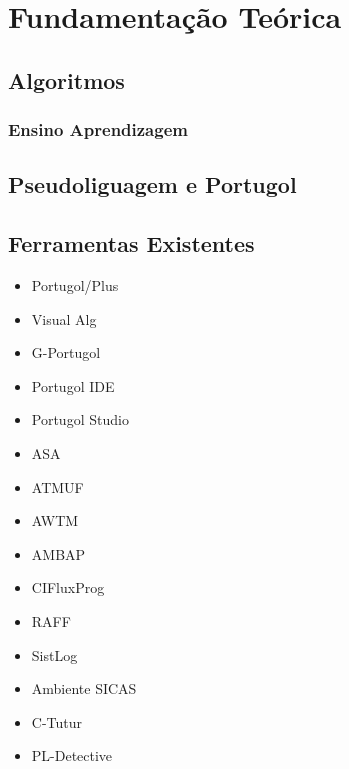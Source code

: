 
\chapter{Fundamentação Teórica}

\section{Algoritmos}

\subsection{Ensino Aprendizagem}


\section{Pseudoliguagem e Portugol}

\section{Ferramentas Existentes}

\begin{itemize}

\item Portugol/Plus

\item Visual Alg

\item G-Portugol

\item Portugol IDE

\item Portugol Studio

\item ASA

\item ATMUF

\item AWTM

\item AMBAP

\item CIFluxProg

\item RAFF

\item SistLog

\item Ambiente SICAS

\item C-Tutur

\item PL-Detective

\end{itemize}

